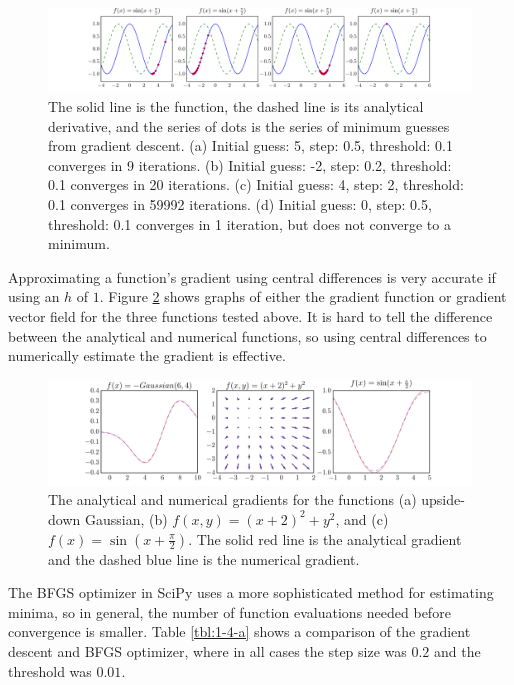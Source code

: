\documentclass[10pt]{article}
\begin{document}
\begin{figure}[!ht]
	\centering
	\includegraphics[width=\textwidth]{exercise1-2-c.pdf}
	\caption{The solid line is the function, the dashed line is its analytical derivative, and the series of dots is the series of minimum guesses from gradient descent. (a) Initial guess: 5, step: 0.5, threshold: 0.1 converges in 9 iterations. (b) Initial guess: -2, step: 0.2, threshold: 0.1 converges in 20 iterations. (c) Initial guess: 4, step: 2, threshold: 0.1 converges in 59992 iterations. (d) Initial guess: 0, step: 0.5, threshold: 0.1 converges in 1 iteration, but does not converge to a minimum. }
	\label{fig:1-2-c}
\end{figure}

Approximating a function's gradient using central differences is very accurate if using an $h$ of $1$. Figure \ref{fig:1-3-a} shows graphs of either the gradient function or gradient vector field for the three functions tested above. It is hard to tell the difference between the analytical and numerical functions, so using central differences to numerically estimate the gradient is effective.

\begin{figure}[!ht]
	\centering
	\includegraphics[width=\textwidth]{exercise1-3-a.pdf}
	\caption{The analytical and numerical gradients for the functions (a) upside-down Gaussian, (b) $f(x, y)= (x + 2)^2 + y^2$, and (c) $f(x) = \sin(x + \frac{\pi}{2})$. The solid red line is the analytical gradient and the dashed blue line is the numerical gradient.}
	\label{fig:1-3-a}
\end{figure}

The \textsc{BFGS} optimizer in SciPy uses a more sophisticated method for estimating minima, so in general, the number of function evaluations needed before convergence is smaller. Table \ref{tbl:1-4-a} shows a comparison of the gradient descent and \textsc{BFGS} optimizer, where in all cases the step size was $0.2$ and the threshold was $0.01$.
\end{document}

